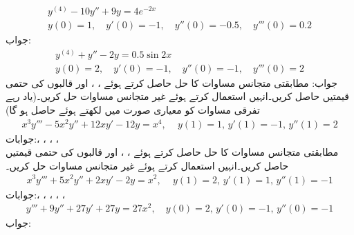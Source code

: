 \begin{align*}
y^{(4)}-10y''+9y=4e^{-2x}\\
y(0)=1, \quad y'(0)=-1,\quad y''(0)=-0.5,\quad y'''(0)=0.2
\end{align*}
جواب:
\begin{align*}
y^{(4)}+y''-2y=0.5\sin 2x\\
y(0)=2, \quad y'(0)=-1,\quad y''(0)=-1,\quad y'''(0)=2
\end{align*}
جواب:
مطابقتی متجانس مساوات  کا حل  حاصل کرتے ہوئے ، ،   اور  قالبوں کی حتمی قیمتیں حاصل کریں۔انہیں استعمال کرتے ہوئے غیر متجانس مساوات حل کریں۔(یاد رہے تفرقی مساوات کو معیاری صورت میں لکھتے ہوئے  حاصل ہو گا) 
\begin{align*}
x^3y'''-5x^2y''+12xy'-12y=x^4, \,\quad y(1)=1,\, y'(1)=-1,\,y''(1)=2
\end{align*}
جوابات:، ، ، ، \\
مطابقتی متجانس مساوات  کا حل  حاصل کرتے ہوئے ، ،   اور  قالبوں کی حتمی قیمتیں حاصل کریں۔انہیں استعمال کرتے ہوئے غیر متجانس مساوات حل کریں۔
\begin{align*}
x^3y'''+5x^2y''+2xy'-2y=x^2, \,\quad y(1)=2,\, y'(1)=1,\,y''(1)=-1
\end{align*}
جوابات:، ، ، ، ، 
\begin{align*}
y'''+9y''+27y'+27y=27x^2, \quad y(0)=2,\, y'(0)=-1,\, y''(0)=-1
\end{align*}
جواب:
